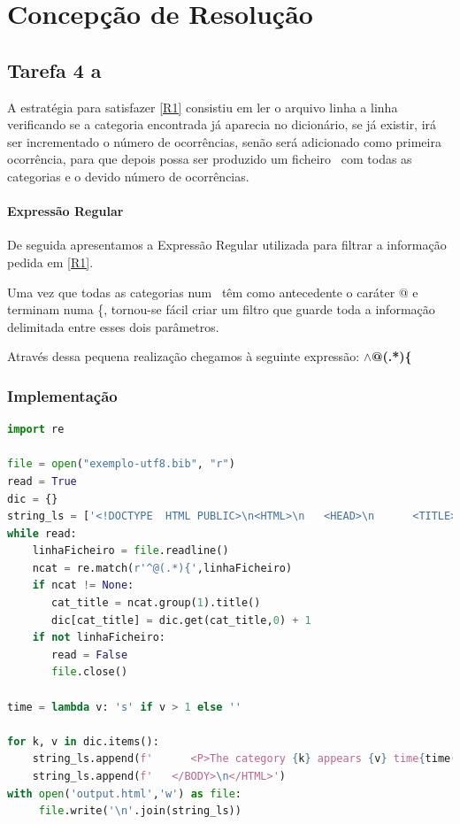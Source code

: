\documentclass[11pt,a4paper]{report}
\begin{document}
\chapter{Concepção de Resolução }
\section{Tarefa 4 a}

A estratégia para satisfazer \ref{R1} consistiu em ler o arquivo linha a linha verificando se a categoria encontrada já aparecia no dicionário, se já existir, irá ser incrementado o número de ocorrências, senão será adicionado como primeira ocorrência, para que depois possa ser produzido um ficheiro \htlm\ com todas as categorias e o devido número de ocorrências.

\subsubsection{Expressão Regular}
De seguida apresentamos a Expressão Regular utilizada para filtrar a informação pedida em \ref{R1}.

Uma vez que todas as categorias num \bib\ têm como antecedente o caráter @ e terminam numa \{, tornou-se fácil criar um filtro que guarde toda a informação delimitada entre esses dois parâmetros.

Através dessa pequena realização chegamos à seguinte expressão: \textbf{$\land$@(.*)\{}

\newpage
\subsection{Implementação}
\begin{lstlisting}[language=python]
import re

file = open("exemplo-utf8.bib", "r")
read = True
dic = {}
string_ls = ['<!DOCTYPE  HTML PUBLIC>\n<HTML>\n   <HEAD>\n      <TITLE>Categories in BibTeX</TITLE>\n   </HEAD>\n   <BODY>']
while read:
    linhaFicheiro = file.readline()
    ncat = re.match(r'^@(.*){',linhaFicheiro)
    if ncat != None:
       cat_title = ncat.group(1).title()
       dic[cat_title] = dic.get(cat_title,0) + 1
    if not linhaFicheiro:
       read = False
       file.close()

time = lambda v: 's' if v > 1 else ''

for k, v in dic.items():
    string_ls.append(f'      <P>The category {k} appears {v} time{time(v)}.</P>')
    string_ls.append(f'   </BODY>\n</HTML>')
with open('output.html','w') as file:
     file.write('\n'.join(string_ls))
\end{lstlisting}
\end{document}
